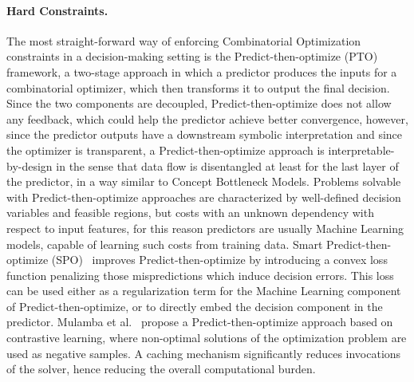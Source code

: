 \paragraph{Hard Constraints.}
%
The most straight-forward way of enforcing Combinatorial Optimization constraints in a decision-making setting is the Predict-then-optimize (PTO)~\cite{el2019generalization} framework, a two-stage approach in which a predictor produces the inputs for a combinatorial optimizer, which then transforms it to output the final decision. Since the two components are decoupled, Predict-then-optimize does not allow any feedback, which could help the predictor achieve better convergence, however, since the predictor outputs have a downstream symbolic interpretation and since the optimizer is transparent, a Predict-then-optimize approach is interpretable-by-design in the sense that data flow is disentangled at least for the last layer of the predictor, in a way similar to Concept Bottleneck Models.
%
Problems solvable with Predict-then-optimize approaches are characterized by well-defined decision variables and feasible regions, but costs with an unknown dependency with respect to input features, for this reason predictors are usually Machine Learning models, capable of learning such costs from training data.
%
Smart Predict-then-optimize (SPO)~\cite{elmachtoub2022smart} improves Predict-then-optimize by introducing a convex loss function penalizing those mispredictions which induce decision errors. This loss can be used either as a regularization term for the Machine Learning component of Predict-then-optimize, or to directly embed the decision component in the predictor.%
%
Mulamba et al.~\cite{mulamba2020contrastive} propose a Predict-then-optimize approach based on contrastive learning, where non-optimal solutions of the optimization problem are used as negative samples. A caching mechanism significantly reduces invocations of the solver, hence reducing the overall computational burden.

